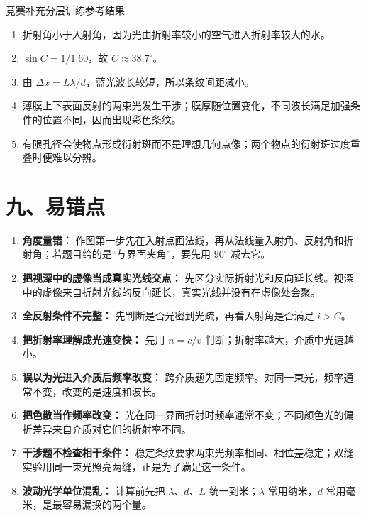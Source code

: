 \begin{learningbox}{竞赛补充分层训练参考结果}
\begin{enumerate}[itemsep=0.45em,topsep=0.3em,parsep=0pt]
  \item 折射角小于入射角，因为光由折射率较小的空气进入折射率较大的水。
  \item $\sin C=1/1.60$，故 $C\approx38.7^\circ$。
  \item 由 $\Delta x=L\lambda/d$，蓝光波长较短，所以条纹间距减小。
  \item 薄膜上下表面反射的两束光发生干涉；膜厚随位置变化，不同波长满足加强条件的位置不同，因而出现彩色条纹。
  \item 有限孔径会使物点形成衍射斑而不是理想几何点像；两个物点的衍射斑过度重叠时便难以分辨。
\end{enumerate}
\end{learningbox}

\section*{九、易错点}
\begin{mistakebox}
\begin{enumerate}
  \item \textbf{角度量错：} 作图第一步先在入射点画法线，再从法线量入射角、反射角和折射角；若题目给的是“与界面夹角”，要先用 $90^\circ$ 减去它。
  \item \textbf{把视深中的虚像当成真实光线交点：} 先区分实际折射光和反向延长线。视深中的虚像来自折射光线的反向延长，真实光线并没有在虚像处会聚。
  \item \textbf{全反射条件不完整：} 先判断是否光密到光疏，再看入射角是否满足 $i>C$。
  \item \textbf{把折射率理解成光速变快：} 先用 $n=c/v$ 判断；折射率越大，介质中光速越小。
  \item \textbf{误以为光进入介质后频率改变：} 跨介质题先固定频率。对同一束光，频率通常不变，改变的是速度和波长。
  \item \textbf{把色散当作频率改变：} 光在同一界面折射时频率通常不变；不同颜色光的偏折差异来自介质对它们的折射率不同。
  \item \textbf{干涉题不检查相干条件：} 稳定条纹要求两束光频率相同、相位差稳定；双缝实验用同一束光照亮两缝，正是为了满足这一条件。
  \item \textbf{波动光学单位混乱：} 计算前先把 $\lambda$、$d$、$L$ 统一到米；$\lambda$ 常用纳米，$d$ 常用毫米，是最容易漏换的两个量。
\end{enumerate}
\end{mistakebox}

